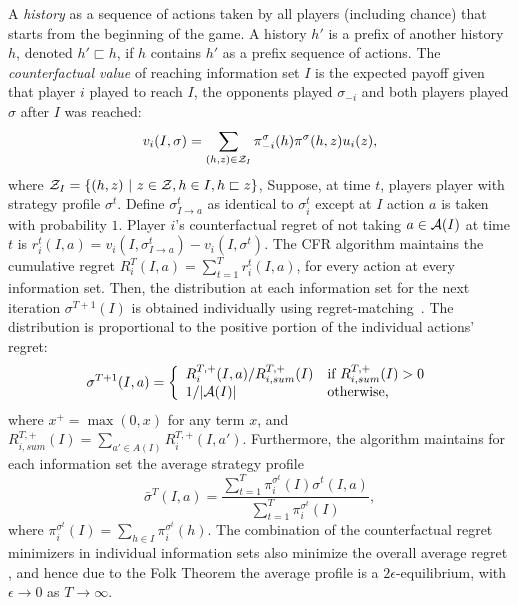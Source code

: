 A {\it history} as a sequence of actions taken by all players (including chance) that starts from the beginning of the game.
A history $h'$ is a prefix of another history $h$, denoted $h' \sqsubset h$, if $h$ contains $h'$ as a prefix sequence of actions.
The {\it counterfactual value} of reaching information set $I$ is the expected payoff given that player $i$ played to reach $I$, the opponents played
$\sigma_{-i}$ and both players played $\sigma$ after $I$ was reached:
\begin{equation}
\label{eq:cfv}
v_i(I,\sigma) = \sum_{(h,z) \in \mathcal{Z}_I} \pi^{\sigma}_{-i}(h) \pi^{\sigma}(h,z) u_i(z),
\end{equation}
where $\mathcal{Z}_I = \{ (h,z)~|~z \in \mathcal{Z}, h \in I, h \sqsubset z \}$, 
Suppose, at time $t$, players player with strategy profile $\sigma^t$.
Define $\sigma^t_{I \rightarrow a}$ as identical to $\sigma^t_i$ except at $I$ action $a$ is taken with probability $1$.
Player $i$'s counterfactual regret of not taking $a \in \mathcal{A}(I)$ at time $t$ is $r_i^t(I,a) = v_i(I, \sigma^t_{I \rightarrow a}) - v_i(I,\sigma^t)$.
The CFR algorithm maintains the cumulative regret $R_i^T(I,a) = \sum_{t=1}^T r_i^t(I,a)$, for every action at every information set.
Then, the distribution at each information set for the next iteration $\sigma^{T+1}(I)$ is obtained individually using
regret-matching~\cite{Hart00}. The distribution is proportional to the positive portion of the individual actions' regret:
\begin{equation*}
\label{eq:rm}
\sigma^{T+1}(I,a) = \left\{
\begin{array}{ll}
R_i^{T,+}(I,a) / R^{T,+}_{i,sum}(I) & \mbox{if } R^{T,+}_{i,sum}(I) > 0 \\
1 / |\mathcal{A}(I)|                   & \mbox{otherwise,}
\end{array} \right.
\end{equation*}
where $x^+ = \max(0,x)$ for any term $x$, and $R^{T,+}_{i,sum}(I) = \sum_{a' \in A(I)} R_i^{T,+}(I,a')$.
Furthermore, the algorithm maintains for each information set the average   strategy profile
\begin{equation}
\bar{\sigma}^T(I,a) = \frac{\sum_{t=1}^T \pi^{\sigma^t}_i(I) \sigma^t(I,a)}{\sum_{t=1}^T \pi^{\sigma^t}_i(I)},
\end{equation}
where $\pi^{\sigma^t}_i(I) = \sum_{h \in I}\pi^{\sigma^t}_i(h)$.
The combination of the counterfactual regret minimizers in individual information sets also minimize the overall
average regret \cite{CFR}, and hence due to the Folk Theorem the average profile is a  $2\epsilon$-equilibrium,
with $\epsilon \rightarrow 0$ as $T \rightarrow \infty$.

